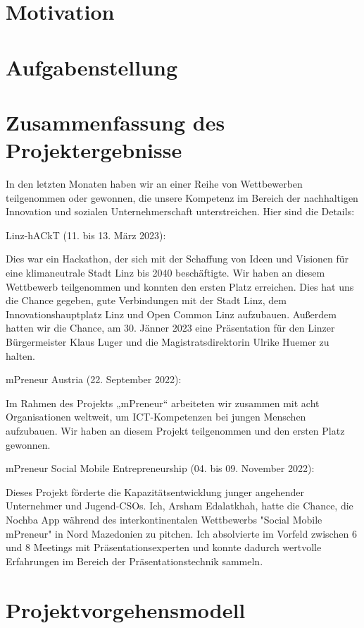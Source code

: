 
\section{Motivation}
\section{Aufgabenstellung}
\section{Zusammenfassung des Projektergebnisse}
In den letzten Monaten haben wir an einer Reihe von Wettbewerben teilgenommen oder gewonnen, die unsere Kompetenz im Bereich der nachhaltigen Innovation und sozialen Unternehmerschaft unterstreichen. Hier sind die Details:

Linz-hACkT (11. bis 13. März 2023): 

Dies war ein Hackathon, der sich mit der Schaffung von Ideen und Visionen für eine klimaneutrale Stadt Linz bis 2040 beschäftigte. Wir haben an diesem Wettbewerb teilgenommen und konnten den ersten Platz erreichen. Dies hat uns die Chance gegeben, gute Verbindungen mit der Stadt Linz, dem Innovationshauptplatz Linz und Open Common Linz aufzubauen. Außerdem hatten wir die Chance, am 30. Jänner 2023 eine Präsentation für den Linzer Bürgermeister Klaus Luger und die Magistratsdirektorin Ulrike Huemer zu halten.

mPreneur Austria (22. September 2022): 

Im Rahmen des Projekts „mPreneur“ arbeiteten wir zusammen mit acht Organisationen weltweit, um ICT-Kompetenzen bei jungen Menschen aufzubauen. Wir haben an diesem Projekt teilgenommen und den ersten Platz gewonnen.

mPreneur Social Mobile Entrepreneurship (04. bis 09. November 2022): 

Dieses Projekt förderte die Kapazitätsentwicklung junger angehender Unternehmer und Jugend-CSOs. Ich, Arsham Edalatkhah, hatte die Chance, die Nochba App während des interkontinentalen Wettbewerbs "Social Mobile mPreneur" in Nord Mazedonien zu pitchen. Ich absolvierte im Vorfeld zwischen 6 und 8 Meetings mit Präsentationsexperten und konnte dadurch wertvolle Erfahrungen im Bereich der Präsentationstechnik sammeln.



\section{Projektvorgehensmodell}
